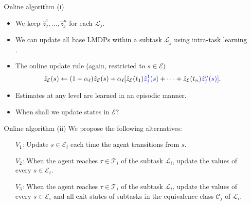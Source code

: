 \documentclass{beamer}
\theoremstyle{mystyle}
\newcommand{\cC}{\mathcal{C}}
\newcommand{\cE}{\mathcal{E}}
\newcommand{\cL}{\mathcal{L}}
\newcommand{\cT}{\mathcal{T}}
\begin{document}
\begin{frame}{Online algorithm (i)}

\begin{itemize}
    
    \item We keep $\hat{z}_j^1,\ldots,\hat{z}_j^n$ for each $\cL_j$.
    \item We can update all base LMDPs within a subtask $\cL_j$ using intra-task learning \citep{Kaelbling93,conf/icaps/Jonsson16}.
    \item The online update rule (again, restricted to $s \in \cE)$
    \[
        \hat{z}_\cE(s) \leftarrow (1 - \alpha_\ell) \hat{z}_\cE(s) + \alpha_\ell [\hat{z}_\cE(t_1) {\color{blue}\hat{z}_j^1(s)} + \cdots + \hat{z}_\cE(t_n) {\color{blue} \hat{z}_j^n(s)}].
    \]
    \item Estimates at any level are learned in an episodic manner.
    \item When shall we update states in $\cE$?
\end{itemize}
    
\end{frame}


\begin{frame}{Online algorithm (ii)}
We propose the following alternatives:
\begin{itemize}
\item[$V_1$:] Update $s\in\cE_i$ each time the agent transitions from $s$.
\item[$V_2$:] When the agent reaches $\tau \in \cT_i$ of the subtask $\cL_i$, update the values of every $s \in \cE_i$.
\item[$V_3$:] When the agent reaches $\tau \in \cT_i$ of the subtask $\cL_i$, update the values of every $s \in \cE_i$ and all exit states of subtasks in the equivalence class $\cC_j$ of $\cL_i$.
\end{itemize}


    
\end{frame}
\end{document}
